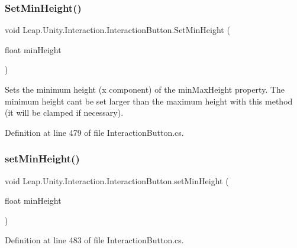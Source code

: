 \mbox{\label{class_leap_1_1_unity_1_1_interaction_1_1_interaction_button_aedfa4f61822e03652ac6678c4367fe48}} 
\subsubsection{\texorpdfstring{SetMinHeight()}{SetMinHeight()}}
{\footnotesize\ttfamily void Leap.\+Unity.\+Interaction.\+Interaction\+Button.\+Set\+Min\+Height (\begin{DoxyParamCaption}\item[{float}]{min\+Height }\end{DoxyParamCaption})}



Sets the minimum height (x component) of the min\+Max\+Height property. The minimum height can\textquotesingle{}t be set larger than the maximum height with this method (it will be clamped if necessary). 



Definition at line 479 of file Interaction\+Button.\+cs.

\mbox{\label{class_leap_1_1_unity_1_1_interaction_1_1_interaction_button_a472b1d9f22f6c8621f3b6db7d28738e1}} 
\subsubsection{\texorpdfstring{setMinHeight()}{setMinHeight()}}
{\footnotesize\ttfamily void Leap.\+Unity.\+Interaction.\+Interaction\+Button.\+set\+Min\+Height (\begin{DoxyParamCaption}\item[{float}]{min\+Height }\end{DoxyParamCaption})}



Definition at line 483 of file Interaction\+Button.\+cs.

